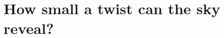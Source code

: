 \providecommand{\TenCDeepSharpJSDModel}{}\renewcommand{\TenCDeepSharpJSDModel}{0.00504}
\providecommand{\TenCDeepSharpJCovData}{}\renewcommand{\TenCDeepSharpJCovData}{74.5}
\providecommand{\TenCDeepSharpJSigData}{}\renewcommand{\TenCDeepSharpJSigData}{0.00569}
\providecommand{\TenCDeepSharpJSDData}{}\renewcommand{\TenCDeepSharpJSDData}{0.00502}
\providecommand{\TenCDeepSharpJCovSims}{}\renewcommand{\TenCDeepSharpJCovSims}{67}
\providecommand{\TenCDeepSharpJSigSims}{}\renewcommand{\TenCDeepSharpJSigSims}{0.00513}
\providecommand{\TenCDeepSharpJSDSims}{}\renewcommand{\TenCDeepSharpJSDSims}{0.00518}
\providecommand{\TenCCovErr}{}\renewcommand{\TenCCovErr}{1.5}
\providecommand{\TenCBiasSigMax}{}\renewcommand{\TenCBiasSigMax}{2.0}
\providecommand{\TenCBiasFracMax}{}\renewcommand{\TenCBiasFracMax}{0.06}
\providecommand{\TenCBiasResol}{}\renewcommand{\TenCBiasResol}{0.09}
\providecommand{\TenCDeepApoJCovModelSig}{}\renewcommand{\TenCDeepApoJCovModelSig}{2.4}
\providecommand{\TenCDeepApoJSigModelGap}{}\renewcommand{\TenCDeepApoJSigModelGap}{2}
\providecommand{\TenCDeepSharpJCovModelSig}{}\renewcommand{\TenCDeepSharpJCovModelSig}{2.4}
\providecommand{\TenCDeepSharpJSigModelGap}{}\renewcommand{\TenCDeepSharpJSigModelGap}{3}
\providecommand{\TenCChiEBPlApo}{}\renewcommand{\TenCChiEBPlApo}{32}
\providecommand{\TenCChiEBPlSharp}{}\renewcommand{\TenCChiEBPlSharp}{34.8}
\providecommand{\TenCChiEBDeepApo}{}\renewcommand{\TenCChiEBDeepApo}{45.2}
\providecommand{\TenCChiEBDeepSharp}{}\renewcommand{\TenCChiEBDeepSharp}{42.3}
\providecommand{\TenCLeakLowApo}{}\renewcommand{\TenCLeakLowApo}{1.5}
\providecommand{\TenCLeakMidApo}{}\renewcommand{\TenCLeakMidApo}{0.12}
\providecommand{\TenCLeakEEpctApo}{}\renewcommand{\TenCLeakEEpctApo}{0.8}
\providecommand{\TenCLeakEEpctMidApo}{}\renewcommand{\TenCLeakEEpctMidApo}{0.048}
\providecommand{\TenCLeakLowSharp}{}\renewcommand{\TenCLeakLowSharp}{2.5}
\providecommand{\TenCLeakMidSharp}{}\renewcommand{\TenCLeakMidSharp}{0.59}
\providecommand{\TenCLeakEEpctSharp}{}\renewcommand{\TenCLeakEEpctSharp}{1.3}
\providecommand{\TenCLeakEEpctMidSharp}{}\renewcommand{\TenCLeakEEpctMidSharp}{0.24}
\providecommand{\TenCLeakRatioLow}{}\renewcommand{\TenCLeakRatioLow}{0.60}
\providecommand{\TenCLeakRatioMid}{}\renewcommand{\TenCLeakRatioMid}{0.20}
\providecommand{\TenCLeakLcLow}{}\renewcommand{\TenCLeakLcLow}{63}
\providecommand{\TenCLeakLcMid}{}\renewcommand{\TenCLeakLcMid}{288}
\section{How small a twist can the sky reveal?}
\label{10c:sec:forecast}

